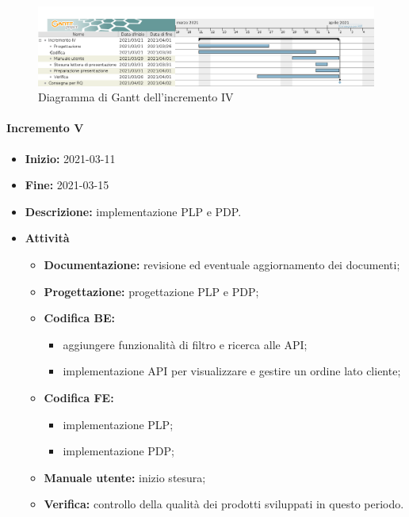 \begin{figure}[H]
    \centering
    \includegraphics[width=1\linewidth]{res/images/pianificazione/incremento_4.png}
    \caption{Diagramma di Gantt dell'incremento IV}
    \label{fig:_Gantt incremento IV}
\end{figure}

\paragraph[Incremento V]{Incremento V}
\begin{itemize}
    \item [] \textbf{Inizio:} 2021-03-11
    \item [] \textbf{Fine:} 2021-03-15
    \item [] \textbf{Descrizione:} implementazione PLP e PDP.
    \item [] \textbf{Attività}
          \begin{itemize}
              \item \textbf{Documentazione:} revisione ed eventuale aggiornamento dei documenti;
              \item \textbf{Progettazione:} progettazione PLP e PDP;
              \item \textbf{Codifica BE:}
                    \begin{itemize}
                        \item aggiungere funzionalità di filtro e ricerca alle API;
                        \item implementazione API per visualizzare e gestire un ordine lato cliente;
                    \end{itemize}
              \item \textbf{Codifica FE:}
                    \begin{itemize}
                        \item implementazione PLP;
                        \item implementazione PDP;
                    \end{itemize}
              \item \textbf{Manuale utente:} inizio stesura;
              \item \textbf{Verifica:} controllo della qualità dei prodotti sviluppati in questo periodo.
          \end{itemize}
\end{itemize}

